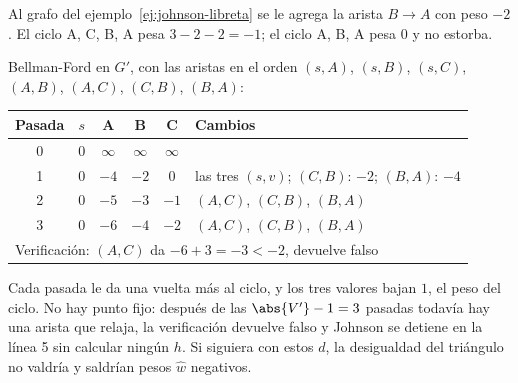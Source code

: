 \documentclass[11pt,letterpaper]{article}
\begin{document}
\begin{ejemplo}
  \label{ej:johnson-ciclo-negativo}
  Al grafo del ejemplo~\ref{ej:johnson-libreta} se le agrega la arista
  $B \to A$ con peso $-2$. El ciclo A, C, B, A pesa $3 - 2 - 2 = -1$;
  el ciclo A, B, A pesa $0$ y no estorba.
  \begin{center}
  \end{center}
  Bellman-Ford en $G'$, con las aristas en el orden $(s, A)$,
  $(s, B)$, $(s, C)$, $(A, B)$, $(A, C)$, $(C, B)$, $(B, A)$:
  \begin{center}
  \small
  \begin{tabular}{cccccl}
    \toprule
    \textbf{Pasada} & $s$ & A & B & C & \textbf{Cambios} \\
    \midrule
    0 & $0$ & $\infty$ & $\infty$ & $\infty$ & \\
    1 & $0$ & $-4$ & $-2$ & $0$
      & las tres $(s, v)$; $(C, B)$: $-2$; $(B, A)$: $-4$ \\
    2 & $0$ & $-5$ & $-3$ & $-1$ & $(A, C)$, $(C, B)$, $(B, A)$ \\
    3 & $0$ & $-6$ & $-4$ & $-2$ & $(A, C)$, $(C, B)$, $(B, A)$ \\
    \midrule
    \multicolumn{6}{l}{Verificación: $(A, C)$ da $-6 + 3 = -3 < -2$,
      devuelve falso} \\
    \bottomrule
  \end{tabular}
  \end{center}
  Cada pasada le da una vuelta más al ciclo, y los tres valores bajan
  $1$, el peso del ciclo. No hay punto fijo: después de las
  $\abs{V'} - 1 = 3$ pasadas todavía hay una arista que relaja, la
  verificación devuelve falso y Johnson se detiene en la línea 5 sin
  calcular ningún $h$. Si siguiera con estos $d$, la desigualdad del
  triángulo no valdría y saldrían pesos $\hat{w}$ negativos.
\end{ejemplo}
\end{document}
